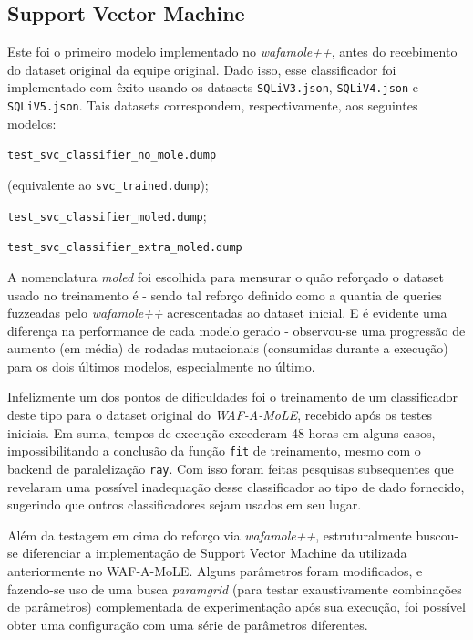 \subsection{Support Vector Machine}
Este foi o primeiro modelo implementado no \textit{wafamole++}, antes do recebimento do dataset original da equipe original. Dado isso, esse classificador foi implementado com êxito usando os datasets \verb+SQLiV3.json+, \verb+SQLiV4.json+ e \verb+SQLiV5.json+. Tais datasets correspondem, respectivamente, aos seguintes modelos:
\begin{alineas}
\item \verb+test_svc_classifier_no_mole.dump+

(equivalente ao \verb+svc_trained.dump+);
\item \verb+test_svc_classifier_moled.dump+;
\item \verb+test_svc_classifier_extra_moled.dump+ 
\end{alineas}

A nomenclatura \textit{moled} foi escolhida para mensurar o quão reforçado o dataset usado no treinamento é - sendo tal reforço definido como a quantia de queries fuzzeadas pelo \textit{wafamole++} acrescentadas ao dataset inicial. E é evidente uma diferença na performance de cada modelo gerado - observou-se uma progressão de aumento (em média) de rodadas mutacionais (consumidas durante a execução) para os dois últimos modelos, especialmente no último.

Infelizmente um dos pontos de dificuldades foi o treinamento de um classificador deste tipo para o dataset original do \textit{WAF-A-MoLE}, recebido após os testes iniciais. Em suma, tempos de execução excederam 48 horas em alguns casos, impossibilitando a conclusão da função \verb+fit+ de treinamento, mesmo com o backend de paralelização \verb+ray+.  Com isso foram feitas pesquisas subsequentes que revelaram uma possível inadequação desse classificador ao tipo de dado fornecido, sugerindo que outros classificadores sejam usados em seu lugar.

Além da testagem em cima do reforço via \textit{wafamole++}, estruturalmente buscou-se diferenciar a implementação de Support Vector Machine da utilizada anteriormente no WAF-A-MoLE. Alguns parâmetros foram modificados, e fazendo-se uso de uma busca \textit{paramgrid} (para testar exaustivamente combinações de parâmetros) complementada de experimentação após sua execução, foi possível obter uma configuração com uma série de parâmetros diferentes.

